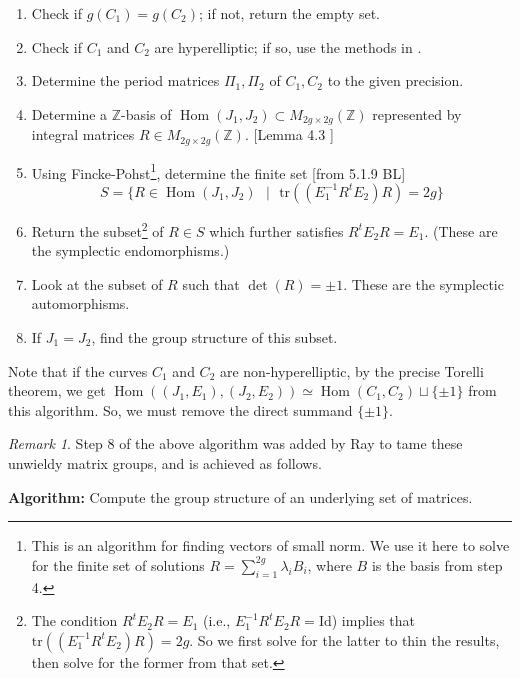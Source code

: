 \documentclass[12pt,reqno]{amsart}
\DeclareMathOperator{\Hom}{Hom}
\newcommand{\Z}{\mathbb{Z}}
\theoremstyle{definition}
\theoremstyle{remark}
\newtheorem*{remark}{Remark}
\begin{document}
\begin{enumerate}
\item Check if $g(C_1) = g(C_2)$; if not, return the empty set.
\item Check if $C_1$ and $C_2$ are hyperelliptic; if so, use the methods in \cite{hyp}.
\item Determine the period matrices $\Pi_1, \Pi_2$ of $C_1, C_2$ to the given precision.
\item Determine a $\Z$-basis of $\Hom(J_1, J_2) \subset M_{2g \times 2g}(\Z)$ represented by integral matrices $R \in  M_{2g \times 2g}(\Z)$. [Lemma 4.3 \cite{numerical}]
\item Using Fincke-Pohst\footnote{This is an algorithm for finding vectors of small norm. We use it here to solve for the finite set of solutions $R = \sum_{i = 1}^{2g} \lambda_i B_i$, where $B$ is the basis from step 4.}, determine the finite set [from 5.1.9 BL] $$S = \{ R \in \Hom(J_1, J_2) \text{ } | \text{ } \text{tr}((E_1^{-1}R^tE_2)R) = 2g\}$$
\item Return the subset\footnote{The condition $R^tE_2R = E_1$ (i.e., $E_1^{-1}R^tE_2R = \text{Id}$) implies that $\text{tr}((E_1^{-1}R^tE_2)R) = 2g$. So we first solve for the latter to thin the results, then solve for the former from that set.}  of $R \in S$ which further satisfies $R^tE_2R = E_1$. (These are the symplectic endomorphisms.)
\item Look at the subset of $R$ such that $\det(R) = \pm 1$. These are the symplectic automorphisms.
\item If $J_1 = J_2$, find the group structure of this subset.
\end{enumerate}

\vspace{+10pt} 

Note that if the curves $C_1$ and $C_2$ are non-hyperelliptic, by the precise Torelli theorem, we get $\Hom((J_1, E_1), (J_2, E_2)) \simeq \Hom(C_1, C_2) \sqcup \{ \pm 1 \}$ from this algorithm. So, we must remove the direct summand $\{ \pm 1 \}$.

\begin{remark} Step 8 of the above algorithm was added by Ray to tame these unwieldy matrix groups, and is achieved as follows.\end{remark}

\textbf{Algorithm:} Compute the group structure of an underlying set of matrices.
\end{document}
